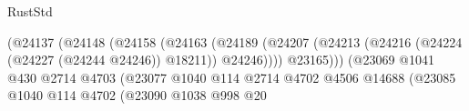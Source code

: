 \begin{lexlean}{RustStd}
\begin{coremodule}
                                                                (@24137
                                                                  (@24148
                                                                    (@24158
                                                                      (@24163
                                                                        (@24189
                                                                          (@24207
                                                                            (@24213
                                                                              (@24216
                                                                                (@24224
                                                                                  (@24227
                                                                                    (@24244 @24246))
                                                                                  @18211))
                                                                              @24246))))
                                                                      @23165)))
                                                                (@23069
                                                                  @1041
                                                                  @430
                                                                  @2714
                                                                  @4703
                                                                  (@23077
                                                                    @1040
                                                                    @114
                                                                    @2714
                                                                    @4702
                                                                    @4506
                                                                    @14688
                                                                    (@23085
                                                                      @1040
                                                                      @114
                                                                      @4702
                                                                      (@23090
                                                                        @1038
                                                                        @998
                                                                        @20

\end{coremodule}
\end{lexlean}
